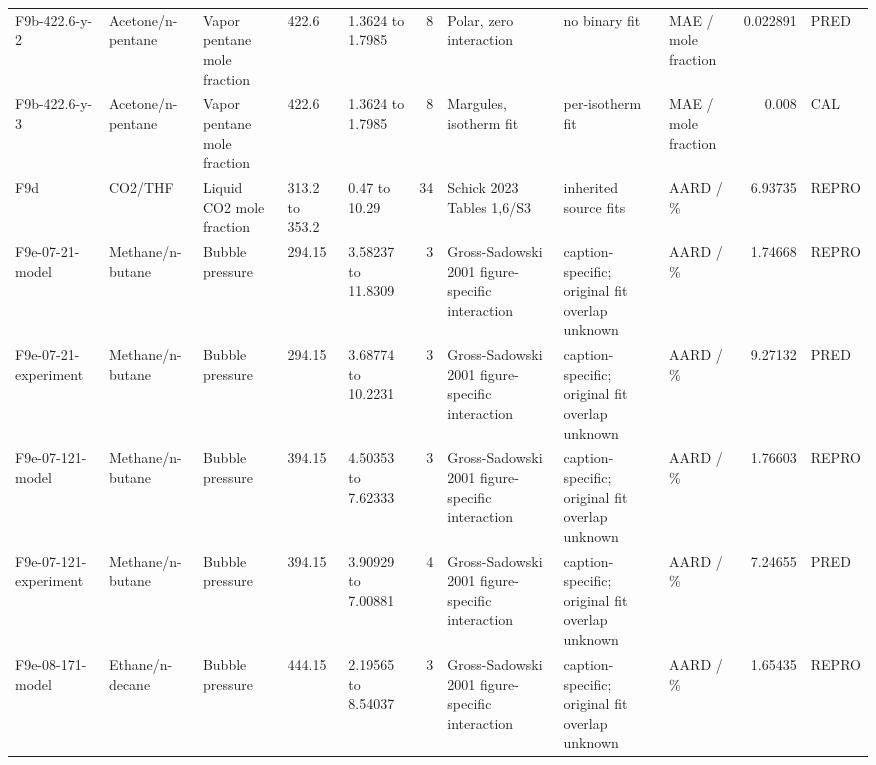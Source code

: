 \begin{landscape}
\begin{longtable}{L{1.9cm}L{2.5cm}L{2.1cm}L{1.6cm}L{1.6cm}rL{2.4cm}L{1.9cm}L{2.2cm}rL{1cm}}
F9b-\allowbreak{}422.6-\allowbreak{}y-\allowbreak{}2 & Acetone/\allowbreak{}n-\allowbreak{}pentane & Vapor pentane mole fraction & 422.6 & 1.3624 to 1.7985 & 8 & Polar, zero interaction & no binary fit & MAE /\allowbreak{} mole fraction & 0.022891 & PRED \\
F9b-\allowbreak{}422.6-\allowbreak{}y-\allowbreak{}3 & Acetone/\allowbreak{}n-\allowbreak{}pentane & Vapor pentane mole fraction & 422.6 & 1.3624 to 1.7985 & 8 & Margules, isotherm fit & per-\allowbreak{}isotherm fit & MAE /\allowbreak{} mole fraction & 0.008 & CAL \\
F9d & CO2/\allowbreak{}THF & Liquid CO2 mole fraction & 313.2 to 353.2 & 0.47 to 10.29 & 34 & Schick 2023 Tables 1,6/\allowbreak{}S3 & inherited source fits & AARD /\allowbreak{} \% & 6.93735 & REPRO \\
F9e-\allowbreak{}07-\allowbreak{}21-\allowbreak{}model & Methane/\allowbreak{}n-\allowbreak{}butane & Bubble pressure & 294.15 & 3.58237 to 11.8309 & 3 & Gross-\allowbreak{}Sadowski 2001 figure-\allowbreak{}specific interaction & caption-\allowbreak{}specific; original fit overlap unknown & AARD /\allowbreak{} \% & 1.74668 & REPRO \\
F9e-\allowbreak{}07-\allowbreak{}21-\allowbreak{}experiment & Methane/\allowbreak{}n-\allowbreak{}butane & Bubble pressure & 294.15 & 3.68774 to 10.2231 & 3 & Gross-\allowbreak{}Sadowski 2001 figure-\allowbreak{}specific interaction & caption-\allowbreak{}specific; original fit overlap unknown & AARD /\allowbreak{} \% & 9.27132 & PRED \\
F9e-\allowbreak{}07-\allowbreak{}121-\allowbreak{}model & Methane/\allowbreak{}n-\allowbreak{}butane & Bubble pressure & 394.15 & 4.50353 to 7.62333 & 3 & Gross-\allowbreak{}Sadowski 2001 figure-\allowbreak{}specific interaction & caption-\allowbreak{}specific; original fit overlap unknown & AARD /\allowbreak{} \% & 1.76603 & REPRO \\
F9e-\allowbreak{}07-\allowbreak{}121-\allowbreak{}experiment & Methane/\allowbreak{}n-\allowbreak{}butane & Bubble pressure & 394.15 & 3.90929 to 7.00881 & 4 & Gross-\allowbreak{}Sadowski 2001 figure-\allowbreak{}specific interaction & caption-\allowbreak{}specific; original fit overlap unknown & AARD /\allowbreak{} \% & 7.24655 & PRED \\
F9e-\allowbreak{}08-\allowbreak{}171-\allowbreak{}model & Ethane/\allowbreak{}n-\allowbreak{}decane & Bubble pressure & 444.15 & 2.19565 to 8.54037 & 3 & Gross-\allowbreak{}Sadowski 2001 figure-\allowbreak{}specific interaction & caption-\allowbreak{}specific; original fit overlap unknown & AARD /\allowbreak{} \% & 1.65435 & REPRO \\

\end{longtable}
\end{landscape}
